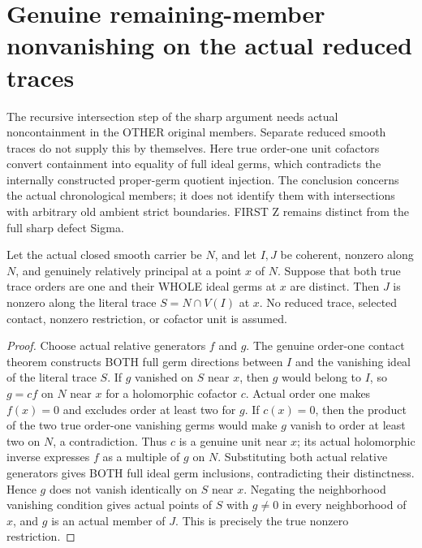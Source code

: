 \section{Genuine remaining-member nonvanishing on the actual reduced traces}

The recursive intersection step of the sharp argument needs actual
noncontainment in the OTHER original members. Separate reduced smooth
traces do not supply this by themselves. Here true order-one unit
cofactors convert containment into equality of full ideal germs, which
contradicts the internally constructed proper-germ quotient injection.
The conclusion concerns the actual chronological members; it does not
identify them with intersections with arbitrary old ambient strict
boundaries. FIRST Z remains distinct from the full sharp defect Sigma.

\begin{lemma}
\label{hir:sharp-actual-order-one-trace-containment-forces-germ-equality}
\leanok
Let the actual closed smooth carrier be $N$, and let $I,J$ be coherent,
nonzero along $N$, and genuinely relatively principal at a point $x$ of
$N$. Suppose that both true trace orders are one and their WHOLE ideal
germs at $x$ are distinct. Then $J$ is nonzero along the literal trace
$S=N\cap V(I)$ at $x$. No reduced trace, selected contact, nonzero
restriction, or cofactor unit is assumed.
\end{lemma}
\begin{proof}
Choose actual relative generators $f$ and $g$. The genuine order-one
contact theorem constructs BOTH full germ directions between $I$ and
the vanishing ideal of the literal trace $S$. If $g$ vanished on $S$
near $x$, then $g$ would belong to $I$, so $g=cf$ on $N$ near $x$ for a
holomorphic cofactor $c$. Actual order one makes $f(x)=0$ and excludes
order at least two for $g$. If $c(x)=0$, then the product of the two true
order-one vanishing germs would make $g$ vanish to order at least two
on $N$, a contradiction. Thus $c$ is a genuine unit near $x$; its actual
holomorphic inverse expresses $f$ as a multiple of $g$ on $N$. Substituting
both actual relative generators gives BOTH full ideal germ inclusions,
contradicting their distinctness. Hence $g$ does not vanish identically
on $S$ near $x$. Negating the neighborhood vanishing condition gives
actual points of $S$ with $g\ne0$ in every neighborhood of $x$, and $g$
is an actual member of $J$. This is precisely the true nonzero restriction.
\end{proof}

